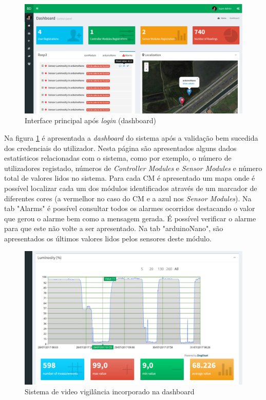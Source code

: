 \begin{figure}[h]
	\centering
	\includegraphics[width=0.9\linewidth]{prints-web/dashboard1.png}
	\caption{Interface principal após \textit{login} (dashboard)}
	\label{ddashboard}
\end{figure}



Na figura \ref{ddashboard} é apresentada a \textit{dashboard} do sistema após a validação bem sucedida dos credenciais do utilizador. Nesta página são apresentados alguns dados estatísticos relacionadas com o sistema, como por exemplo, o número de utilizadores registado, números de \textit{Controller Modules} e \textit{Sensor Modules} e número total de valores lidos no sistema. Para cada \acl{CM} é apresentado um mapa onde é possível localizar cada um dos módulos identificados através de um marcador de diferentes cores (a vermelhor no caso do \acl{CM} e a azul nos \textit{Sensor Modules}). Na tab "Alarms" é possível consultar todos os alarmes ocorridos destacando o valor que gerou o alarme bem como a mensagem gerada. É possível verificar o alarme para que este não volte a ser apresentado. Na tab "arduinoNano", são apresentados os últimos valores lidos pelos sensores deste módulo. 













\begin{figure}[h]
	\centering
	\includegraphics[width=0.7\linewidth]{prints-web/humidity.png}
	\caption{Sistema de video vigilância incorporado na dashboard}
	\label{vigilancia}
\end{figure}



